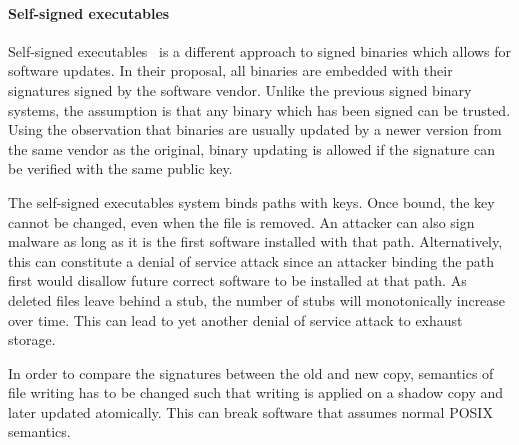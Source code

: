 \paragraph{Self-signed executables}

Self-signed executables~\cite{wurster2007self} is a different approach
to signed binaries which allows for software updates.
In their proposal, all binaries are embedded with their signatures signed
by the software vendor.
Unlike the previous signed binary systems, the assumption is that any
binary which has been signed can be trusted.
Using the observation that binaries are usually updated by a newer
version from the same vendor as the original,
binary updating is allowed if the signature can be verified
with the same public key.

The self-signed executables system binds paths with keys.
Once bound, the key cannot be changed, even when the file is removed.
An attacker can also sign malware as long as it is the first
software installed with that path.
Alternatively, this can constitute a denial of service attack since
an attacker binding the path first would disallow future correct
software to be installed at that path.
As deleted files leave behind a stub, the number of stubs will
monotonically increase over time. This can lead to yet another
denial of service attack to exhaust storage.

In order to compare the signatures between the old and new copy,
semantics of file writing has to be changed such that
writing is applied on a shadow copy and later updated atomically.
This can break software that assumes normal POSIX semantics.
